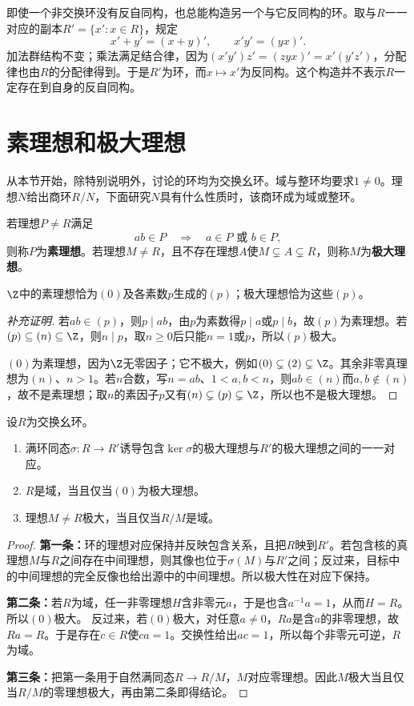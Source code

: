 即使一个非交换环没有反自同构，也总能构造另一个与它反同构的环。取与$R$一一对应的副本$R'=\{x':x\in R\}$，规定
\[
x'+y'=(x+y)',\qquad x'y'=(yx)'.
\]
加法群结构不变；乘法满足结合律，因为$(x'y')z'=(zyx)'=x'(y'z')$，分配律也由$R$的分配律得到。于是$R'$为环，而$x\mapsto x'$为反同构。这个构造并不表示$R$一定存在到自身的反自同构。


\section{素理想和极大理想}

从本节开始，除特别说明外，讨论的环均为交换幺环。域与整环均要求$1\ne0$。理想$N$给出商环$R/N$，下面研究$N$具有什么性质时，该商环成为域或整环。

\begin{definition}
若理想$P\ne R$满足
\[
ab\in P\quad\Longrightarrow\quad a\in P\text{ 或 }b\in P,
\]
则称$P$为\textbf{素理想}。若理想$M\ne R$，且不存在理想$A$使$M\subsetneq A\subsetneq R$，则称$M$为\textbf{极大理想}。
\end{definition}

\begin{example}
$\Z$中的素理想恰为$(0)$及各素数$p$生成的$(p)$；极大理想恰为这些$(p)$。
\end{example}
\begin{proof}[补充证明]
若$ab\in(p)$，则$p\mid ab$，由$p$为素数得$p\mid a$或$p\mid b$，故$(p)$为素理想。若$(p)\subseteq(n)\subseteq\Z$，则$n\mid p$，取$n\geq0$后只能$n=1$或$p$，所以$(p)$极大。

$(0)$为素理想，因为$\Z$无零因子；它不极大，例如$(0)\subsetneq(2)\subsetneq\Z$。其余非零真理想为$(n)$、$n>1$。若$n$合数，写$n=ab$、$1<a,b<n$，则$ab\in(n)$而$a,b\notin(n)$，故不是素理想；取$n$的素因子$p$又有$(n)\subsetneq(p)\subsetneq\Z$，所以也不是极大理想。
\end{proof}

\begin{theorem}\label{p2:prime-maximal}
设$R$为交换幺环。
\begin{enumerate}
\item 满环同态$\sigma:R\to R'$诱导包含$\ker\sigma$的极大理想与$R'$的极大理想之间的一一对应。
\item $R$是域，当且仅当$(0)$为极大理想。
\item 理想$M\ne R$极大，当且仅当$R/M$是域。
\end{enumerate}
\end{theorem}
\begin{proof}
\textbf{第一条：}环的理想对应保持并反映包含关系，且把$R$映到$R'$。若包含核的真理想$M$与$R$之间存在中间理想，则其像也位于$\sigma(M)$与$R'$之间；反过来，目标中的中间理想的完全反像也给出源中的中间理想。所以极大性在对应下保持。

\textbf{第二条：}若$R$为域，任一非零理想$H$含非零元$a$，于是也含$a^{-1}a=1$，从而$H=R$。所以$(0)$极大。
反过来，若$(0)$极大，对任意$a\ne0$，$Ra$是含$a$的非零理想，故$Ra=R$。于是存在$c\in R$使$ca=1$。交换性给出$ac=1$，所以每个非零元可逆，$R$为域。

\textbf{第三条：}把第一条用于自然满同态$R\to R/M$，$M$对应零理想。因此$M$极大当且仅当$R/M$的零理想极大，再由第二条即得结论。
\end{proof}

